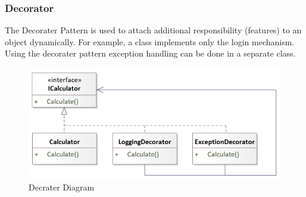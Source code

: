 \documentclass[11pt]{article}
\begin{document}
\subsubsection{Decorator}
\label{sec:orgf013ada}
The Decorater Pattern is used to attach additional responsibility (features) to an object dynamically.
For example, a class implements only the login mechanism.
Using the decorater pattern exception handling can be done in a separate class.


\begin{figure}[htbp]
\centering
\includegraphics[width=.9\linewidth]{img/decorater.png}
\caption{\label{fig:decrater-diagram}Decrater Diagram}
\end{figure}
\end{document}

